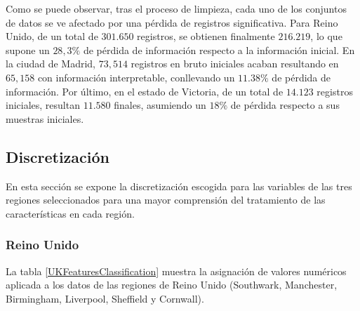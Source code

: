 

Como se puede observar, tras el proceso de limpieza, cada uno de los conjuntos de datos se ve afectado por una pérdida de registros significativa. Para Reino Unido, de un total de $301.650$ registros, se obtienen finalmente $216.219$, lo que supone un $28,3\%$ de pérdida de información respecto a la información inicial. En la ciudad de Madrid, $73,514$ registros en bruto iniciales acaban resultando en $65,158$ con información interpretable, conllevando un $11.38\%$ de pérdida de información. Por último, en el estado de Victoria, de un total de $14.123$ registros iniciales, resultan $11.580$ finales, asumiendo un $18\%$ de pérdida respecto a sus muestras iniciales.

\subsection{Discretización}

En esta sección se expone la discretización escogida para las variables de las tres regiones seleccionados para una mayor comprensión del tratamiento de las características en cada región.

\subsubsection*{Reino Unido}

La tabla \ref{UKFeaturesClassification} muestra la asignación de valores numéricos aplicada a los datos de las regiones de Reino Unido (Southwark, Manchester, Birmingham, Liverpool, Sheffield y Cornwall).

